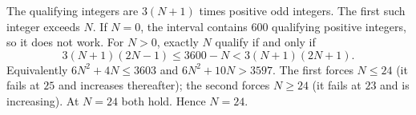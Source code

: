 The qualifying integers are $3(N+1)$ times positive odd integers. The first such integer exceeds $N$. If $N=0$, the interval contains $600$ qualifying positive integers, so it does not work. For $N>0$, exactly $N$ qualify if and only if
\[
3(N+1)(2N-1)\le3600-N<3(N+1)(2N+1).
\]
Equivalently $6N^2+4N\le3603$ and $6N^2+10N>3597$. The first forces $N\le24$ (it fails at $25$ and increases thereafter); the second forces $N\ge24$ (it fails at $23$ and is increasing). At $N=24$ both hold. Hence $\boxed{N=24}$.
